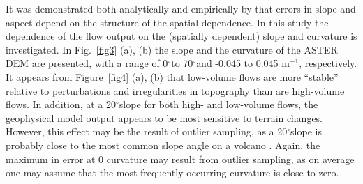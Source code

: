 \documentclass[a4paper,fleqn]{article}
\newcommand{\Deg}{$^{\circ}$}
\begin{document}
It was demonstrated both analytically and empirically by
\cite{Hunter_Goodchild_1997} that errors in slope and aspect depend
on the structure of the spatial dependence. In this study the
dependence of the flow output on the (spatially dependent) slope and
curvature is investigated. In Fig.~\ref{fig3} (a), (b) the slope and
the curvature of the ASTER DEM are presented, with a range of 0\Deg to
70\Deg and -0.045 to 0.045 m$^{-1}$, respectively. It appears from
Figure~\ref{fig4} (a), (b) that low-volume flows are more ``stable''
relative to perturbations and irregularities in topography than are
high-volume flows.  In addition, at a 20\Deg slope for both high- and
low-volume flows, the geophysical model output appears to be most
sensitive to terrain changes.  However, this effect may be the result
of outlier sampling, as a 20\Deg slope is probably close to the most
common slope angle on a volcano \citep{BuPaPi05}.  Again, the maximum
in error at 0 curvature may result from outlier sampling, as on
average one may assume that the most frequently occurring curvature is
close to zero.
\end{document}
